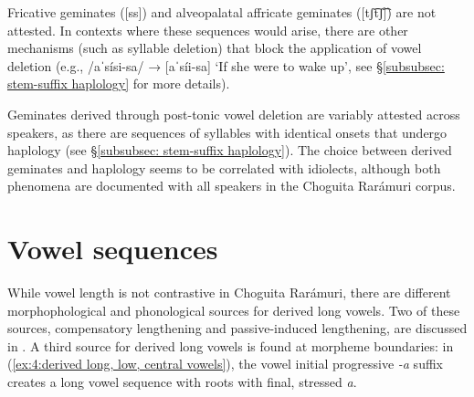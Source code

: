     \label{ex:4:marginal types of geminatesa}
        \label{ex:4:marginal types of geminatesb}
            \label{ex:4:marginal types of geminatesc}
    \z
\z

Fricative geminates ([ss]) and alveopalatal affricate geminates ([tʃ͡tʃ͡]) are not attested. In contexts where these sequences would arise, there are other mechanisms (such as syllable deletion) that block the application of vowel deletion (e.g., /aˈsísi-sa/ → [aˈsíi-sa] `If she were to wake up', see §\ref{subsubsec: stem-suffix haplology} for more details).

Geminates derived through post-tonic vowel deletion are variably attested across speakers, as there are sequences of syllables with identical onsets that undergo haplology (see §\ref{subsubsec: stem-suffix haplology}). The choice between derived geminates and haplology seems to be correlated with idiolects, although both phenomena are documented with all speakers in the Choguita Rarámuri corpus.

\section{Vowel sequences}
\label{subsec: vowel sequences}

While vowel length is not contrastive in Choguita Rarámuri, there are different morphophological and phonological sources for derived long vowels. Two of these sources, compensatory lengthening and passive-induced lengthening, are discussed in . A third source for derived long vowels is found at morpheme boundaries: in (\ref{ex:4:derived long, low, central vowels}), the vowel initial progressive \textit{-a} suffix creates a long vowel sequence with roots with final, stressed \textit{a}.

